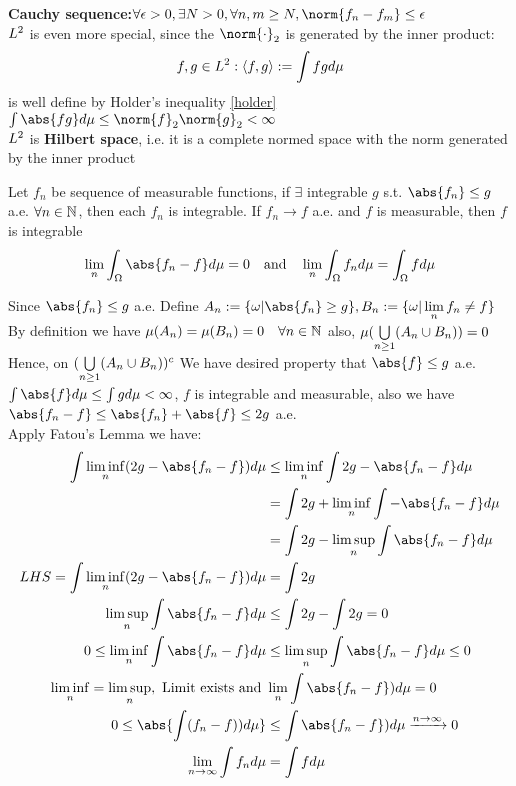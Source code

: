 \textbf{Cauchy sequence:}$\forall \epsilon > 0, \exists N >0 , \forall n,m \geq N, \norm{f_n - f_m} \leq \epsilon$  \\
$L^{2}$ is even more special, since the $\norm{\cdot}_2$ is generated by the inner product: \begin{equation*}
    f,g\in L^{2}: \langle f,g \rangle := \int fg d\mu
\end{equation*}is well define by Holder’s inequality \ref{holder} $\int \abs{fg} d\mu \leq \norm{f}_2\norm{g}_2 < \infty$ \\
$L^{2}$ is \textbf{Hilbert space}, i.e. it is a complete normed space with the norm generated by the inner product
\newpage 

\newpage
\begin{thm}
\label{DCT}
Let $f_n$ be sequence of measurable functions, if $\exists$ integrable $g$ s.t. $\abs{f_n} \leq g$ a.e. $\forall n \in \mathbb{N}$, then each $f_n$ is integrable. If $f_n \rightarrow f$ a.e. and $f$ is measurable, then $f$ is integrable
\begin{equation*}
    \biglim{n} \into \abs{f_n - f} d\mu = 0 \quad \text{and} \quad \biglim{n}\into f_n d\mu = \into f d\mu 
\end{equation*}
\end{thm}
\vspace{2cm}
\pf Since $\abs{f_n}\leq g$ a.e. Define $A_n := \{\omega| \abs{f_n}\geq g\}, B_n := \{\omega| \biglim{n}f_n \neq f\}$ \\
By definition we have $\mu(A_n)=\mu(B_n)=0\quad \forall n\in \mathbb{N}$ also,  $\mu(\bigcup\limits_{n\geq1}(A_n\cup B_n)) = 0$ \\
Hence, on $(\bigcup\limits_{n\geq1}(A_n\cup B_n))^c$ We have desired property that $\abs{f}\leq g$ a.e. \\
$\int \abs{f} d\mu \leq \int g d\mu < \infty$, $f$ is integrable and measurable, also we have $\abs{f_n - f} \leq \abs{f_n} +\abs{f} \leq 2g$ a.e. \\
Apply Fatou's Lemma we have:
\begin{align*}
    \int \linf{n}(2g - \abs{f_n-f}) d\mu &\leq \linf{n}\int 2g - \abs{f_n - f}d\mu \\
    &= \int 2g + \linf{n}\int -\abs{f_n-f} d\mu \\
    &= \int 2g - \lsup{n} \int \abs{f_n-f} d\mu \\
    LHS = \int \linf{n}(2g - \abs{f_n-f}) d\mu &= \int 2g \\
    \lsup{n} \int \abs{f_n-f} d\mu &\leq \int 2g - \int 2g = 0 \\
    0 \leq \linf{n}\int \abs{f_n-f} d\mu &\leq \lsup{n}\int \abs{f_n-f} d\mu \leq 0 \\
    \linf{n} = \lsup{n}, \text{ Limit exists and } &\biglim{n}\int \abs{f_n-f}) d\mu = 0 \\
    0 \leq \abs{\int (f_n-f)) d\mu} &\leq \int \abs{f_n-f}) d\mu \xrightarrow{n \rightarrow \infty} 0\\
    \biglim{n \rightarrow \infty} \int f_n d\mu &= \int f d\mu
\end{align*}
\newpage
